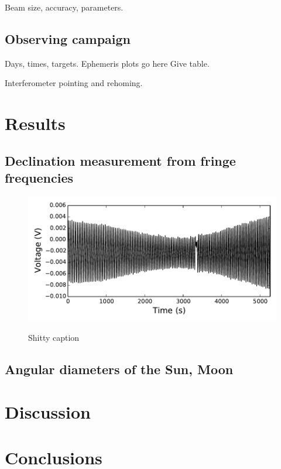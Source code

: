 \documentclass[10pt]{article}
\begin{document}
Beam size, accuracy, parameters.

\subsection{Observing campaign}

Days, times, targets.  Ephemeris plots go here
Give table.

Interferometer pointing and rehoming.
\section{Results}

\subsection{Declination measurement from fringe frequencies}

\begin{figure}[!ht]
    \centering
    \includegraphics[scale=1]{code_analysis/sun_test.pdf} \\
    \caption{Shitty caption}
\end{figure}

\subsection{Angular diameters of the Sun, Moon}

\section{Discussion}

\section{Conclusions}
\end{document}
